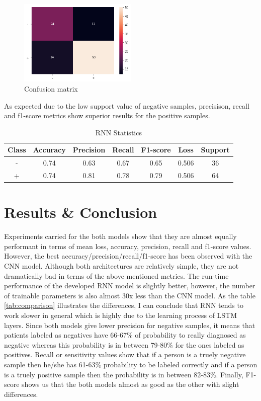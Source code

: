 \documentclass[a4paper]{article}
\begin{document}
\begin{figure}[h]
	\centering
	\includegraphics[width=0.5\textwidth]{img/rnn_prfs.png}
	\caption{Confusion matrix}
	\label{fig:rnn_prfs}
\end{figure}

As expected due to the low support value of negative samples, precisison, recall and f1-score metrics show superior results for the positive samples.

\begin{table}[h]
	\centering
	\begin{tabular}{|c|c|c|c|c|c|c|}
		\hline
		\textbf{Class} & \textbf{Accuracy} & \textbf{Precision} & \textbf{Recall} & \textbf{F1-score} & \textbf{Loss} & \textbf{Support} \\
		\hline
		- & 0.74 & 0.63 & 0.67 & 0.65 & 0.506 & 36 \\
		+ & 0.74 & 0.81 & 0.78 & 0.79 & 0.506 & 64 \\
		\hline
	\end{tabular}
	\caption{RNN Statistics}
	\label{tab:rnn_stats}
\end{table}

\section{Results \& Conclusion}
Experiments carried for the both models show that they are almost equally performant in terms of mean loss, accuracy, precision, recall and f1-score values. However, the best accuracy/precision/recall/f1-score 
has been observed with the CNN model. Although both architectures are relatively simple, they are not dramatically bad in terms of the above mentioned metrics. The run-time performance of the developed RNN 
model is slightly better, however, the number of trainable parameters is also almost 30x less than the CNN model. As the table \ref{tab:comparison} illustrates the differences, I can conclude that RNN tends to 
work slower in general which is highly due to the learning process of LSTM layers. Since both models give lower precision for negative samples, it means that patients labeled as negatives have 66-67\% of 
probability to really diagnosed as negative whereas this probability is in between 79-80\% for the ones labeled as positives. Recall or sensitivity values show that if a person is a truely negative sample then 
he/she has 61-63\% probability to be labeled correctly and if a person is a truely positive sample then the probability is in between 82-83\%. Finally, F1-score shows us that the both models almost as good as 
the other with slight differences.
\end{document}
